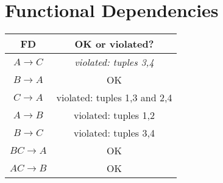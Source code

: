 \section{Functional Dependencies}
\begin{tabular}{|c|c|}
\hline
\textbf{FD} & \textbf{OK or violated?} \\ \hline
$A \rightarrow C$ & \textit{violated: tuples 3,4} \\ \hline
$B \rightarrow A$ & OK \\ \hline
$C \rightarrow A$ & violated: tuples 1,3 and 2,4 \\ \hline
$A \rightarrow B$ & violated: tuples 1,2 \\ \hline
$B \rightarrow C$ & violated: tuples 3,4 \\ \hline
$BC \rightarrow A$ & OK \\ \hline
$AC \rightarrow B$ & OK \\ \hline
\end{tabular}
